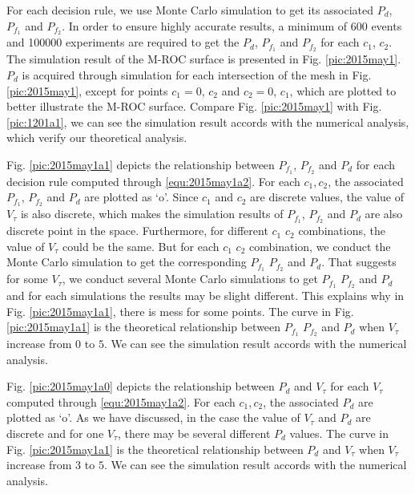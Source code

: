 For each decision rule, we use Monte Carlo simulation to get its associated $P_d$, $P_{f_1}$ and $P_{f_2}$.   
In order to ensure highly accurate results, a minimum of 600 events and 100000 experiments are required to get the $P_d$, $P_{f_1}$ and $P_{f_2}$ for each $c_1$, $c_2$. The simulation result of the M-ROC surface is presented in Fig. \ref{pic:2015may1}. $P_d$ is acquired through simulation for each intersection of the mesh in Fig. \ref{pic:2015may1}, except for points $c_1 = 0$, $c_2$ and $c_2 = 0$, $c_1$, which are plotted to better illustrate the M-ROC surface. 
Compare Fig. \ref{pic:2015may1} with Fig. \ref{pic:1201a1}, we can see the simulation result accords with the numerical analysis, which verify our theoretical analysis.

Fig. \ref{pic:2015may1a1} depicts the relationship between $P_{f_1}$, $P_{f_2}$ and $P_d$ for each decision rule computed through \eqref{equ:2015may1a2}.  For each $c_1, c_2$, the associated  $P_{f_1}$, $P_{f_2}$ and $P_d$ are plotted as `o'.   Since $c_1$ and $c_2$ are discrete values, the value of $V_\tau$ is also discrete, which makes the simulation results of $P_{f_1}$, $P_{f_2}$ and $P_d$ are also discrete point in the space. Furthermore, for different $c_1$ $c_2$ combinations, the value of $V_\tau$ could be the same. But for each $c_1$ $c_2$ combination, we conduct the Monte Carlo simulation to get the corresponding $P_{f_1}$ $P_{f_2}$ and $P_d$. That suggests for some $V_\tau$, we conduct several Monte Carlo simulations to get  $P_{f_1}$ $P_{f_2}$ and $P_d$ and for each simulations the results may be slight different. This explains why in Fig. \ref{pic:2015may1a1}, there is mess for some points. The curve in Fig. \ref{pic:2015may1a1} is the theoretical relationship between $P_{f_1}$ $P_{f_2}$ and $P_d$ when $V_\tau$ increase from $0$ to $5$. We can see the simulation result accords with the numerical analysis. 

Fig. \ref{pic:2015may1a0} depicts the relationship between  $P_d$ and $V_\tau$ for each $V_\tau$  computed through \eqref{equ:2015may1a2}.  For each $c_1, c_2$, the associated $P_d$ are plotted as `o'. As we have discussed,  in the case the value of $V_\tau$ and $P_d$ are discrete and for one $V_\tau$, there may be several different $P_d$ values. The curve in Fig. \ref{pic:2015may1a1} is the theoretical relationship between $P_d$ and $V_\tau$ when $V_\tau$ increase from $3$ to $5$. We can see the simulation result accords with the numerical analysis. 


